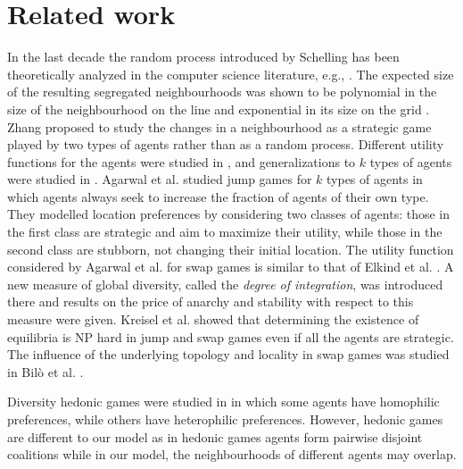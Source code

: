 \section{Related work}
\label{sec:related}

In the last decade the random process introduced by Schelling has been theoretically analyzed  in the computer science literature, e.g.,  
\cite{brandt2012analysis,STOC2012Circleanalysis}. The expected size of the resulting segregated neighbourhoods was shown to be polynomial in the size of the neighbourhood on the line \cite{brandt2012analysis} and exponential in its size on the grid \cite{STOC2012Circleanalysis}. 
Zhang \cite{zhang2004dynamic} proposed to study the changes in a neighbourhood as a strategic game played by two types of agents  rather than as a random process. Different utility functions for the agents were studied in \cite{chauhan2018schelling}, and generalizations to $k$ types of agents were studied in \cite{echzell2019convergence}.
Agarwal et al. \cite{schelling-journal} studied jump games  for $k$ types of agents in which agents always seek to increase the fraction of agents of their own type. They modelled location preferences by considering two 
classes of agents: those in the first class  are strategic and aim to maximize their utility, while those in the second class are stubborn, not 
changing their initial location.
The utility function considered by Agarwal et al. \cite{agarwal2020swap} for swap games is similar to that of Elkind et al. \cite{schelling-journal}. 
A new measure of global diversity, called the  {\em degree of integration}, was introduced there 
and  results on the price of anarchy and stability with respect to this measure were given. 
Kreisel et al. \cite{kreisel2021equilibria} showed that determining the existence of equilibria is NP hard in jump and swap games even if all the agents are strategic. The influence of the underlying topology and locality in swap games was studied in Bil{\`o} et al. \cite{bilo2022topological}.

Diversity hedonic games were studied in \cite{bredereck2019hedonic} in which some agents have homophilic preferences, while others have heterophilic preferences. However, hedonic games are different to our model as in hedonic games agents form pairwise disjoint coalitions while in our model, the neighbourhoods of different agents may overlap. 


